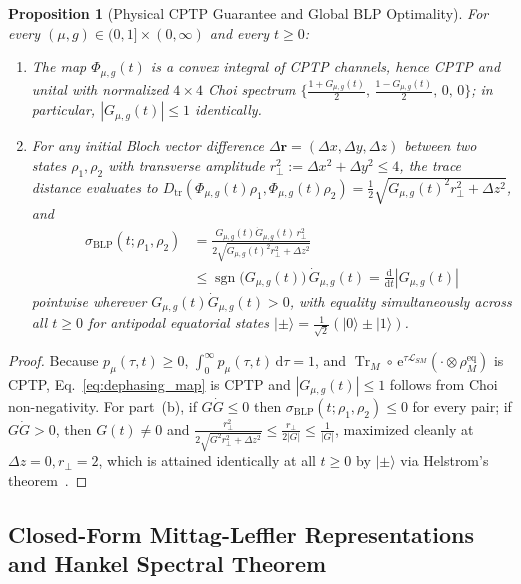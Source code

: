 \documentclass[twocolumn,10pt,amsmath,amssymb,floatfix]{revtex4-2}
\theoremstyle{plain}
\newtheorem{proposition}[theorem]{Proposition}
\theoremstyle{definition}
\newcommand{\dd}{\mathrm{d}}
\newcommand{\ee}{\mathrm{e}}
\newcommand{\Tr}{\operatorname{Tr}}
\newcommand{\sgn}{\operatorname{sgn}}
\begin{document}
\begin{proposition}[Physical CPTP Guarantee and Global BLP Optimality]
\label{prop:cptp_blp}
For every $(\mu,g) \in (0,1] \times (0,\infty)$ and every $t \ge 0$:
\begin{enumerate}[label=(\alph*),leftmargin=1.5em,itemsep=1pt]
\item The map $\Phi_{\mu,g}(t)$ is a convex integral of CPTP channels, hence CPTP and unital with normalized $4\times 4$ Choi spectrum $\big\{\frac{1+G_{\mu,g}(t)}{2},\,\frac{1-G_{\mu,g}(t)}{2},\,0,\,0\big\}$; in particular, $|G_{\mu,g}(t)| \le 1$ identically.
\item For any initial Bloch vector difference $\Delta\mathbf{r} = (\Delta x, \Delta y, \Delta z)$ between two states $\rho_1,\rho_2$ with transverse amplitude $r_\perp^2 := \Delta x^2 + \Delta y^2 \le 4$, the trace distance evaluates to $D_{\mathrm{tr}}(\Phi_{\mu,g}(t)\rho_1,\Phi_{\mu,g}(t)\rho_2) = \frac{1}{2}\sqrt{G_{\mu,g}(t)^2 r_\perp^2 + \Delta z^2}$, and
\begin{align}
\label{eq:blp_helstrom}
\sigma_{\mathrm{BLP}}(t;\rho_1,\rho_2) &= \frac{G_{\mu,g}(t)\dot{G}_{\mu,g}(t)\,r_\perp^2}{2\sqrt{G_{\mu,g}(t)^2 r_\perp^2 + \Delta z^2}} \nonumber\\
&\le \sgn\!\big(G_{\mu,g}(t)\big)\,\dot{G}_{\mu,g}(t) = \frac{\dd}{\dd t}|G_{\mu,g}(t)|
\end{align}
pointwise wherever $G_{\mu,g}(t)\dot{G}_{\mu,g}(t) > 0$, with equality simultaneously across all $t \ge 0$ for antipodal equatorial states $|\pm\rangle = \frac{1}{\sqrt{2}}(|0\rangle \pm |1\rangle)$.
\end{enumerate}
\end{proposition}
\begin{proof}
Because $p_\mu(\tau,t) \ge 0$, $\int_0^\infty p_\mu(\tau,t)\,\dd\tau = 1$, and $\Tr_M\circ\,\ee^{\tau\mathcal{L}_{SM}}(\cdot\otimes\rho_M^{\mathrm{eq}})$ is CPTP, Eq.~\eqref{eq:dephasing_map} is CPTP and $|G_{\mu,g}(t)| \le 1$ follows from Choi non-negativity. For part~(b), if $G\dot{G} \le 0$ then $\sigma_{\mathrm{BLP}}(t;\rho_1,\rho_2) \le 0$ for every pair; if $G\dot{G} > 0$, then $G(t)\neq 0$ and $\frac{r_\perp^2}{2\sqrt{G^2 r_\perp^2 + \Delta z^2}} \le \frac{r_\perp}{2|G|} \le \frac{1}{|G|}$, maximized cleanly at $\Delta z = 0, r_\perp = 2$, which is attained identically at all $t \ge 0$ by $|\pm\rangle$ via Helstrom's theorem~\cite{Helstrom1976Book,Breuer2009PRL}.
\end{proof}

\subsection{Closed-Form Mittag-Leffler Representations and Hankel Spectral Theorem}
\label{subsec:hankel}
\end{document}
